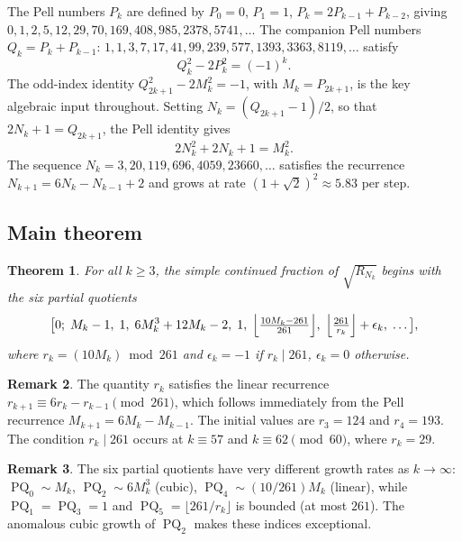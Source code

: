 \documentclass[12pt]{amsart}
\newtheorem{theorem}{Theorem}[section]
\theoremstyle{definition}
\newtheorem{remark}[theorem]{Remark}
\newcommand{\floor}[1]{\lfloor #1 \rfloor}
\DeclareMathOperator{\PQ}{PQ}
\begin{document}
The Pell numbers $P_k$ are defined by $P_0=0$, $P_1=1$,
$P_k = 2P_{k-1}+P_{k-2}$, giving
$0, 1, 2, 5, 12, 29, 70, 169, 408, 985, 2378, 5741, \ldots$
The companion Pell numbers $Q_k = P_k + P_{k-1}$:
$1, 1, 3, 7, 17, 41, 99, 239, 577, 1393, 3363, 8119, \ldots$
satisfy
\begin{equation}\label{eq:pell}
  Q_k^2 - 2P_k^2 = (-1)^k.
\end{equation}
The odd-index identity $Q_{2k+1}^2 - 2M_k^2 = -1$, with $M_k = P_{2k+1}$,
is the key algebraic input throughout.  Setting $N_k = (Q_{2k+1}-1)/2$,
so that $2N_k + 1 = Q_{2k+1}$, the Pell identity gives
\begin{equation}\label{eq:pell-Nk}
  2N_k^2 + 2N_k + 1 = M_k^2.
\end{equation}
The sequence $N_k = 3, 20, 119, 696, 4059, 23660, \ldots$ satisfies
the recurrence $N_{k+1} = 6N_k - N_{k-1} + 2$ and grows at rate
$(1+\sqrt{2})^2 \approx 5.83$ per step.

\subsection{Main theorem}

\begin{theorem}\label{thm:main}
  For all $k \geq 3$, the simple continued fraction of $\sqrt{R_{N_k}}$
  begins with the six partial quotients
  \begin{equation}\label{eq:main-cf}
    \bigl[0;\; M_k-1,\; 1,\; 6M_k^3+12M_k-2,\; 1,\;
    \Bigl\lfloor\tfrac{10M_k-261}{261}\Bigr\rfloor,\;
    \Bigl\lfloor\tfrac{261}{r_k}\Bigr\rfloor + \epsilon_k,\;
    \ldots\,\bigr],
  \end{equation}
  where $r_k = (10M_k)\bmod 261$ and $\epsilon_k = -1$ if
  $r_k \mid 261$, $\epsilon_k = 0$ otherwise.
\end{theorem}

\begin{remark}
  The quantity $r_k$ satisfies the linear recurrence
  $r_{k+1} \equiv 6r_k - r_{k-1} \pmod{261}$, which follows immediately
  from the Pell recurrence $M_{k+1} = 6M_k - M_{k-1}$.  The initial
  values are $r_3 = 124$ and $r_4 = 193$.  The condition $r_k \mid 261$
  occurs at $k \equiv 57$ and $k \equiv 62 \pmod{60}$, where $r_k = 29$.
\end{remark}

\begin{remark}\label{rem:growth}
  The six partial quotients have very different growth rates as $k \to \infty$:
  $\PQ_0 \sim M_k$, $\PQ_2 \sim 6M_k^3$ (cubic), $\PQ_4 \sim (10/261)M_k$
  (linear), while $\PQ_1 = \PQ_3 = 1$ and $\PQ_5 = \floor{261/r_k}$
  is bounded (at most $261$).  The anomalous cubic growth of $\PQ_2$
  makes these indices exceptional.
\end{remark}
\end{document}
